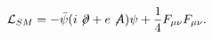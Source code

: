 \begin{equation}
{\cal L}_{SM}=-\bar{\psi}(i\not\!\partial+ e \not\! A )\psi + 
\frac{1}{4} F_{\mu \nu}F_{\mu \nu}.
\end{equation}

